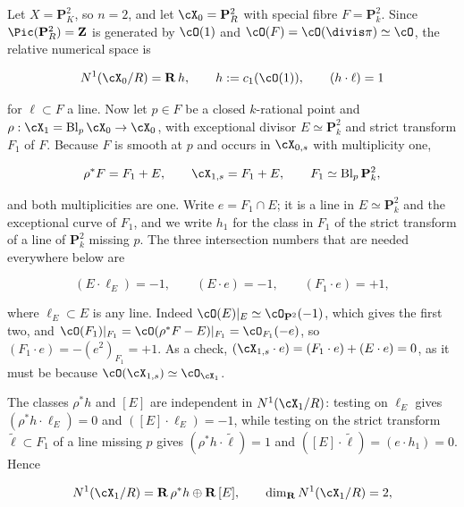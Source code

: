 \begin{example}
\label{ex:ch20-p2-blowup-numerics}
Let $X=\mathbf P^2_K$, so $n=2$, and let $\cX_0=\mathbf P^2_R$ with
special fibre $F=\mathbf P^2_k$.  Since $\Pic(\mathbf P^2_R)=\mathbf Z$
is generated by $\cO(1)$ and $\cO(F)=\cO(\divis\pi)\simeq\cO$, the
relative numerical space is

\begin{equation}
\label{eq:ch20-p2-n1}
 N^1(\cX_0/R)=\mathbf R\,h,\qquad h:=c_1(\cO(1)),
 \qquad (h\cdot\ell)=1
\end{equation}

for $\ell\subset F$ a line.  Now let $p\in F$ be a closed $k$-rational
point and $\rho:\cX_1=\operatorname{Bl}_p\cX_0\to\cX_0$, with exceptional
divisor $E\simeq\mathbf P^2_k$ and strict transform $F_1$ of $F$.
Because $F$ is smooth at $p$ and occurs in $\cX_{0,s}$ with
multiplicity one,

\begin{equation}
\label{eq:ch20-p2-special-fibre}
 \rho^*F=F_1+E,
 \qquad
 \cX_{1,s}=F_1+E,
 \qquad
 F_1\simeq\operatorname{Bl}_p\mathbf P^2_k,
\end{equation}

and both multiplicities are one.  Write $e=F_1\cap E$; it is a line in
$E\simeq\mathbf P^2_k$ and the exceptional curve of $F_1$, and we write
$h_1$ for the class in $F_1$ of the strict transform of a line of
$\mathbf P^2_k$ missing $p$.  The three intersection numbers that are
needed everywhere below are

\begin{equation}
\label{eq:ch20-p2-blowup-table}
 (E\cdot\ell_E)=-1,\qquad
 (E\cdot e)=-1,\qquad
 (F_1\cdot e)=+1,
\end{equation}

where $\ell_E\subset E$ is any line.  Indeed
$\cO(E)|_E\simeq\cO_{\mathbf P^2}(-1)$, which gives the first two, and
$\cO(F_1)|_{F_1}=\cO(\rho^*F-E)|_{F_1}=\cO_{F_1}(-e)$, so
$(F_1\cdot e)=-(e^2)_{F_1}=+1$.  As a check,
$(\cX_{1,s}\cdot e)=(F_1\cdot e)+(E\cdot e)=0$, as it must be because
$\cO(\cX_{1,s})\simeq\cO_{\cX_1}$.

The classes $\rho^*h$ and $[E]$ are independent in $N^1(\cX_1/R)$:
testing on $\ell_E$ gives $(\rho^*h\cdot\ell_E)=0$ and
$([E]\cdot\ell_E)=-1$, while testing on the strict transform
$\tilde\ell\subset F_1$ of a line missing $p$ gives
$(\rho^*h\cdot\tilde\ell)=1$ and $([E]\cdot\tilde\ell)=(e\cdot h_1)=0$.
Hence

\begin{equation}
\label{eq:ch20-p2-blowup-n1}
 N^1(\cX_1/R)=\mathbf R\,\rho^*h\oplus\mathbf R\,[E],
 \qquad \dim_{\mathbf R}N^1(\cX_1/R)=2,
\end{equation}


\end{example}
